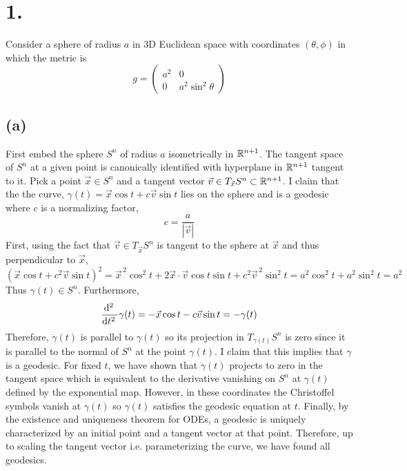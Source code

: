 \documentclass[12pt]{article}
\begin{document}

\section*{1.}

Consider a sphere of radius $a$ in 3D Euclidean space with coordinates $(\theta, \phi)$ in which the metric is
\[ g = \begin{pmatrix}
a^2 & 0 
\\
0 & a^2 \sin^2{\theta} 
\end{pmatrix} \]


\subsection*{(a)}

First embed the sphere $S^n$ of radius $a$ isometrically in $\mathbb{R}^{n+1}$. The tangent space of $S^n$ at a given point is canonically identified with hyperplane in $\mathbb{R}^{n+1}$ tangent to it. Pick a point $\vec{x} \in S^n$ and a tangent vector $\vec{v} \in T_{\vec{x}} S^n \subset \mathbb{R}^{n+1}$. I claim that the the curve, $\gamma(t) = \vec{x} \cos{t} + c \vec{v} \sin{t}$ lies on the sphere and is a geodesic where $c$ is a normalizing factor,
\[ c = \frac{a}{|\vec{v}|} \]
First, using the fact that $\vec{v} \in T_{\vec{x}} S^n$ is tangent to the sphere at $\vec{x}$ and thus perpendicular to $\vec{x}$, 
\[ (\vec{x} \cos{t} + c^2 \vec{v} \sin{t})^2 = \vec{x}^{\, 2} \cos^2{t} + 2 \vec{x} \cdot \vec{v} \cos{t} \sin{t} + c^2 \vec{v}^{\, 2} \sin^2{t} = a^2 \cos^2{t} + a^2 \sin^2{t} = a^2 \]
Thus $\gamma(t) \in S^n$. Furthermore,
\[ \frac{\mathrm{d}^{2}  \:}{\mathrm{d}t^{2} \:} \gamma(t) = - \vec{x} \cos{t} - c \vec{v} \sin{t} = - \gamma(t) \]
Therefore, $\ddot{\gamma}(t)$ is parallel to $\gamma(t)$ so its projection in $T_{\gamma(t)} S^n$ is zero since it is parallel to the normal of $S^n$ at the point $\gamma(t)$. I claim that this implies that $\gamma$ is a geodesic. For fixed $t$, we have shown that $\ddot{\gamma}(t)$ projects to zero in the tangent space which is equivalent to the derivative vanishing on $S^n$ at $\gamma(t)$ defined by the exponential map. However, in these coordinates the Christoffel symbols vanish at $\gamma(t)$ so $\gamma(t)$ satisfies the geodesic equation at $t$. Finally, by the existence and uniqueness theorem for ODEs, a geodesic is uniquely characterized by an initial point and a tangent vector at that point. Therefore, up to scaling the tangent vector i.e. parameterizing the curve, we have found all geodesics.
\end{document}
